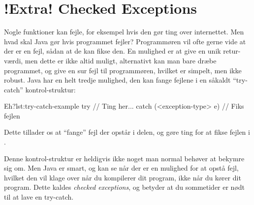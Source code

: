 \section{!Extra! Checked Exceptions}

	Nogle funktioner kan fejle, for eksempel hvis den gør ting over internettet.
	Men hvad skal Java gør hvis programmet fejler? Programmøren vil ofte gerne
	vide at der er en fejl, sådan at de kan fikse den. En mulighed er at give en
	unik retur-værdi, men dette er ikke altid muligt, alternativt kan man bare
	dræbe programmet, og give en sur fejl til programmøren, hvilket er simpelt,
	men ikke robust. Java har en helt tredje mulighed, den kan fange fejlene i
	en såkaldt ``try-catch'' kontrol-struktur:

	\begin{JavaCode}{Eh?}{lst:try-catch-example}
		try {
			// Ting her...
		} catch (<exception-type> e) {
			// Fiks fejlen
		}
	\end{JavaCode}

	Dette tillader os at ``fange'' fejl der opstår i 
	delen, og gøre ting for at fikse fejlen i .

	Denne kontrol-struktur er heldigvis ikke noget man normal behøver at bekymre
	sig om. Men Java er smart, og kan se når der er en mulighed for at opstå
	fejl, hvilket den vil klage over når du kompilerer dit program, ikke når du
	kører dit program. Dette kaldes \emph{checked exceptions}, og betyder at du
	sommetider er nødt til at lave en try-catch.



